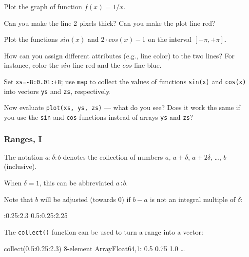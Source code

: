 \documentclass[english,serif,mathserif,xcolor=pdftex,dvipsnames,table]{beamer}
\begin{document}
\begin{frame}
  \begin{exercise*}[4.A]
    Plot the graph of function $f(x) = 1/x$.

    Can you make the line 2 pixels thick?  Can you make the plot line
    red?
  \end{exercise*}

  \+
  \begin{exercise*}[4.B]
    Plot the functions $sin(x)$ and $2 \cdot cos(x) - 1$ on the
    interval $[-\pi, +\pi]$.

    How can you assign different attributes (e.g., line color) to the
    two lines?  For instance, color the $sin$ line red and the
    $cos$ line blue.
  \end{exercise*}

  \+
  \begin{exercise*}[4.C]
    Set \texttt{xs=-8:0.01:+8}; use \texttt{map} to collect the values
    of functions \texttt{sin(x)} and \texttt{cos(x)} into vectors
    \texttt{ys} and \texttt{zs}, respectively.

    Now evaluate \texttt{plot(xs, ys, zs)} --- what do you see?
    Does it work the same if you use the \texttt{sin} and \texttt{cos}
    functions instead of arrays \texttt{ys} and \texttt{zs}?
  \end{exercise*}
\end{frame}


\begin{frame}
  \frametitle{Ranges, I}
  \small
  The notation $a:\delta:b$ denotes the collection of numbers $a$,
  $a+\delta$, $a+2\delta$, \ldots, $b$ (inclusive).

  \+
  When $\delta=1$, this can be abbreviated \texttt{$a$:$b$}.

  \+ Note that $b$ will be adjusted (towards 0) if $b-a$ is not an
  integral multiple of $\delta$:
\begin{semiverbatim}
:0.25:2.3
0.5:0.25:2.25
\end{semiverbatim}

  \+
  The \texttt{collect()} function can be used to turn a range into a vector:
\begin{semiverbatim}
\julia collect(0.5:0.25:2.3)
8-element Array{Float64,1}:
 0.5
 0.75
 1.0
 \ldots
\end{semiverbatim}

\end{frame}
\end{document}
